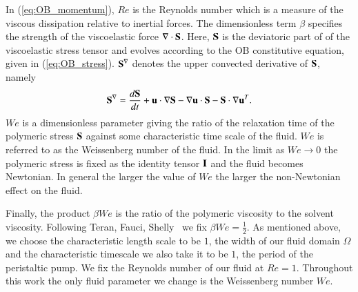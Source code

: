 In (\ref{eq:OB_momentum}), $Re$ is the Reynolds number which is a measure of the viscous dissipation relative to inertial forces. The dimensionless term $\beta$  specifies the strength of the viscoelastic force $\nabla\cdot\mathbf{S}$. Here, $\mathbf{S}$ is the deviatoric part of of the viscoelastic stress tensor and evolves according to the OB constitutive equation, given in (\ref{eq:OB_stress}). $\mathbf{S}^\nabla$ denotes the upper convected derivative of $\mathbf{S}$, namely
\begin{equation}
\mathbf{S}^\nabla = \frac{d\mathbf{S}}{dt} + \mathbf{u}\cdot\nabla\mathbf{S} - \nabla \mathbf{u} \cdot \mathbf{S} - \mathbf{S} \cdot \nabla\mathbf{u}^T.
\end{equation}
 $We$ is a dimensionless parameter giving the ratio of the relaxation time of the polymeric stress $\mathbf{S}$ against some characteristic time scale of the fluid. $We$ is referred to as the Weissenberg number of the fluid. In the limit as $We\to 0$ the polymeric stress is fixed as the identity tensor $\mathbf{I}$ and the fluid becomes Newtonian. In general the larger the value of $We$ the larger the non-Newtonian effect on the fluid.

Finally, the product $\beta We$ is the ratio of the polymeric viscosity to the solvent viscosity. Following Teran, Fauci, Shelly~\cite{teran2008peristaltic}
we fix $\beta We=\frac{1}{2}$. As mentioned above, we choose the characteristic length scale to be $1$, the width of our fluid domain $\Omega$ and the characteristic timescale we also take it  to be $1$, the period of the peristaltic pump. We fix the Reynolds number of our fluid at $Re=1$. Throughout this work the only fluid parameter we change is the Weissenberg number $We$.


